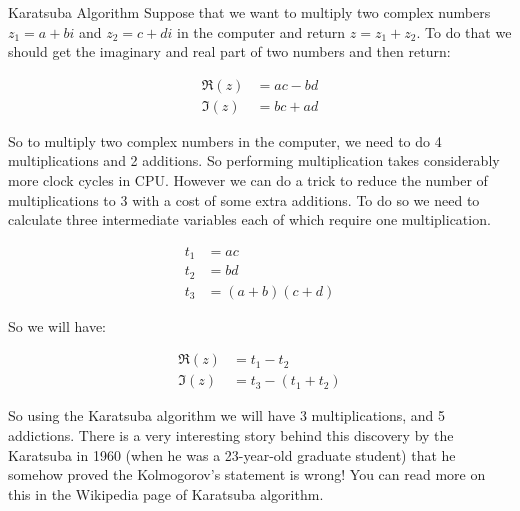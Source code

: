 \begin{example}{Karatsuba Algorithm}
Suppose that we want to multiply two complex numbers $z_1 = a + bi$ and $ z_2 = c + di$ in the computer and return $z = z_1 + z_2$. To do that we should get the imaginary and real part of two numbers and then return:

\begin{align*}
\Re (z) &= ac - bd \\
\Im (z) &= bc + ad
\end{align*}

So to multiply two complex numbers in the computer, we need to do 4 multiplications and 2 additions. So performing multiplication takes considerably more clock cycles in CPU. However we can do a trick to reduce the number of multiplications to 3 with a cost of some extra additions. To do so we need to calculate three intermediate variables each of which require one multiplication.

\begin{align*}
t_1 &= ac \\
t_2 &= bd \\
t_3 &= (a+b)(c+d)
\end{align*}

So we will have:

\begin{align*}
\Re (z) &= t_1 - t_2 \\
\Im (z) &= t_3 - (t_1 + t_2)
\end{align*}

So using the Karatsuba algorithm we will have 3 multiplications, and 5 addictions. There is a very interesting story behind this discovery by the Karatsuba in 1960 (when he was a 23-year-old graduate student) that he somehow proved the Kolmogorov's statement is wrong! You can read more on this in the Wikipedia page of Karatsuba algorithm.   

\end{example}

